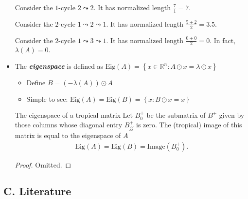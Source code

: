 \documentclass{article}
\begin{document}
\begin{itemize}
\begin{example*}{}{}
		Consider the \( 1 \)-cycle \( 2 \leadsto 2 \). It has normalized length \( \frac{7}{1} = 7 \).

		Consider the \( 2 \)-cycle \( 1 \leadsto 2 \leadsto 1 \). It has normalized length \( \frac{5 + 2}{2} = 3.5 \).

		Consider the \( 2 \)-cycle \( 1 \leadsto 3 \leadsto 1 \). It has normalized length \( \frac{0 + 0}{2} = 0 \). In fact, \( \lambda(A) = 0 \).
	\end{example*}

	\item The \textbf{\textit{eigenspace}} is defined as \( \mathrm{Eig}(A) = \left\{ x \in \mathbb{R}^n : A \odot x = \lambda \odot x \right\} \)
		\begin{itemize}
			\item Define \( B = (-\lambda(A)) \odot A \)
   		\item Simple to see: \( \mathrm{Eig}(A) = \mathrm{Eig}(B) = \left\{ x : B \odot x = x \right\} \)
		\end{itemize}
 
	\begin{theorem*}{The eigenspace of a tropical matrix  \cite[Thm. 7.13]{inv2nonlinearalgebra}}{}
		Let \( B^+_0 \) be the submatrix of \( B^+ \) given by those columns whose diagonal entry \( B_{jj}^+ \) is zero. The (tropical) image of this matrix is equal to the eigenspace of \( A \)
		\begin{align*}
			\mathrm{Eig}(A) = \mathrm{Eig}(B) = \mathrm{Image}(B^+_0).
		\end{align*}
	\end{theorem*}

	\begin{proof}
		Omitted.
	\end{proof}
\end{itemize}

\subsection*{C. Literature}


\end{document}
